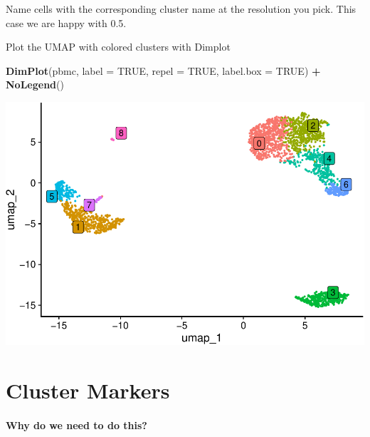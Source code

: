 \documentclass[
]{book}
\newenvironment{Shaded}{\begin{snugshade}}{\end{snugshade}}
\newcommand{\AttributeTok}[1]{\textcolor[rgb]{0.13,0.29,0.53}{#1}}
\newcommand{\CommentTok}[1]{\textcolor[rgb]{0.56,0.35,0.01}{\textit{#1}}}
\newcommand{\ConstantTok}[1]{\textcolor[rgb]{0.56,0.35,0.01}{#1}}
\newcommand{\FloatTok}[1]{\textcolor[rgb]{0.00,0.00,0.81}{#1}}
\newcommand{\FunctionTok}[1]{\textcolor[rgb]{0.13,0.29,0.53}{\textbf{#1}}}
\newcommand{\NormalTok}[1]{#1}
\newcommand{\OtherTok}[1]{\textcolor[rgb]{0.56,0.35,0.01}{#1}}
\newcommand{\SpecialCharTok}[1]{\textcolor[rgb]{0.81,0.36,0.00}{\textbf{#1}}}
\begin{document}
Name cells with the corresponding cluster name at the resolution you pick. This case we are happy with 0.5.

\begin{Shaded}
\end{Shaded}

Plot the UMAP with colored clusters with Dimplot

\begin{Shaded}
\begin{Highlighting}[]
\FunctionTok{DimPlot}\NormalTok{(pbmc, }\AttributeTok{label =} \ConstantTok{TRUE}\NormalTok{, }\AttributeTok{repel =} \ConstantTok{TRUE}\NormalTok{, }\AttributeTok{label.box =} \ConstantTok{TRUE}\NormalTok{) }\SpecialCharTok{+} \FunctionTok{NoLegend}\NormalTok{()}
\end{Highlighting}
\end{Shaded}

\includegraphics{scRNAseqInR_Doco_files/figure-latex/unnamed-chunk-27-1.pdf}

\chapter{Cluster Markers}\label{clustermarkers}

\subsubsection*{Why do we need to do this?}\label{why-do-we-need-to-do-this-6}
\end{document}
